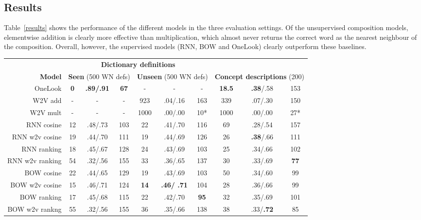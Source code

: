 \subsection{Results}



Table~\ref{results} shows the performance of the different models in the three evaluation settings. Of the unsupervised composition models, elementwise addition is clearly more effective than multiplication, which almost never returns the correct word as the nearest neighbour of the composition. Overall, however, the supervised models (RNN, BOW and OneLook) clearly outperform these baselines. 

\begin{table*}[ht]
    \centering
    
\renewcommand{\tabcolsep}{4.6pt}
\begin{adjustwidth}{-0.3cm}{}
{\small
\hfill{}
\begin{tabular}{r|ccc|ccc|ccc}

\multicolumn{1}{c}{}& \multicolumn{6}{|c|}{\bf Dictionary definitions} & \multicolumn{3}{c}{} \\
\multicolumn{1}{r}{\textbf{Model}}&\multicolumn{3}{|c|}{\textbf{Seen} (500 WN defs)}& \multicolumn{3}{|c|}{\textbf{Unseen} (500 WN defs)} & \multicolumn{3}{|c}{\textbf{Concept descriptions} (200)} \\

\hline

\rule{0pt}{4ex} 
OneLook & \bf 0 & \bf .89/.91 & \bf 67  & - & - & - &  \bf 18.5 &  {\bf .38}/.58 & 153    \\

\hdashline 
\rule{0pt}{2ex} 
 W2V add & - & - & - & 923 & .04/.16 & 163 & 339 & .07/.30 & 150    \\
 W2V mult &- &- & -& 1000 & .00/.00 & 10* &   1000 & .00/.00 & 27* \\
\hdashline 
\rule{0pt}{2ex} 
 RNN cosine & 12 & .48/.73 & 103 &  22 & .41/.70 & 116 & 69 & .28/.54 & 157 \\
 RNN w2v cosine & 19 & .44/.70 & 111 & 19 & .44/.69 & 126 & 26 & {\bf .38}/.66 & 111  \\
 RNN ranking & 18 & .45/.67 & 128 &	24 & .43/.69 & 103 & 25 & .34/.66 & 102 \\
 RNN w2v ranking & 54 & .32/.56 & 155 & 33 & .36/.65 & 137 &	30 & .33/.69 & \bf 77 \\
BOW cosine &22 & .44/.65 & 129 & 19 & .43/.69 & 103 & 50 & .34/.60 &  99 \\
BOW w2v cosine & 15 & .46/.71 & 124 &  \bf14 & \bf .46/ .71 &  104	 & 28 & .36/.66 &  99 \\
BOW ranking & 17 & .45/.68 &  115 &	 22 & .42/.70 & \bf 95 &	32 & .35/.69 & 101   \\
BOW w2v rankng & 55 & .32/.56 & 155 &	36 & .35/.66 & 138 &	38 & .33/{\bf .72} & 85 \\


\end{tabular}}
\end{adjustwidth}
\end{table*}
